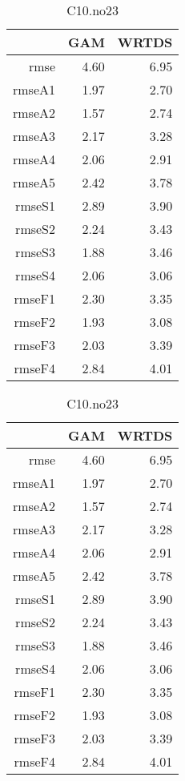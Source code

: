 \documentclass[12pt]{amsart}
\begin{document}

\begin{table}[H]
\centering
\begin{tabular}{rrr}
  \hline
 & GAM & WRTDS \\ 
  \hline
rmse & 4.60 & 6.95 \\ 
  rmseA1 & 1.97 & 2.70 \\ 
  rmseA2 & 1.57 & 2.74 \\ 
  rmseA3 & 2.17 & 3.28 \\ 
  rmseA4 & 2.06 & 2.91 \\ 
  rmseA5 & 2.42 & 3.78 \\ 
  rmseS1 & 2.89 & 3.90 \\ 
  rmseS2 & 2.24 & 3.43 \\ 
  rmseS3 & 1.88 & 3.46 \\ 
  rmseS4 & 2.06 & 3.06 \\ 
  rmseF1 & 2.30 & 3.35 \\ 
  rmseF2 & 1.93 & 3.08 \\ 
  rmseF3 & 2.03 & 3.39 \\ 
  rmseF4 & 2.84 & 4.01 \\ 
   \hline
\end{tabular}
\caption{C10.no23}
\end{table}

\begin{table}[H]
\centering
\begin{tabular}{rrr}
  \hline
 & GAM & WRTDS \\ 
  \hline
rmse & 4.60 & 6.95 \\ 
  rmseA1 & 1.97 & 2.70 \\ 
  rmseA2 & 1.57 & 2.74 \\ 
  rmseA3 & 2.17 & 3.28 \\ 
  rmseA4 & 2.06 & 2.91 \\ 
  rmseA5 & 2.42 & 3.78 \\ 
  rmseS1 & 2.89 & 3.90 \\ 
  rmseS2 & 2.24 & 3.43 \\ 
  rmseS3 & 1.88 & 3.46 \\ 
  rmseS4 & 2.06 & 3.06 \\ 
  rmseF1 & 2.30 & 3.35 \\ 
  rmseF2 & 1.93 & 3.08 \\ 
  rmseF3 & 2.03 & 3.39 \\ 
  rmseF4 & 2.84 & 4.01 \\ 
   \hline
\end{tabular}
\caption{C10.no23}
\end{table}
\end{document}
